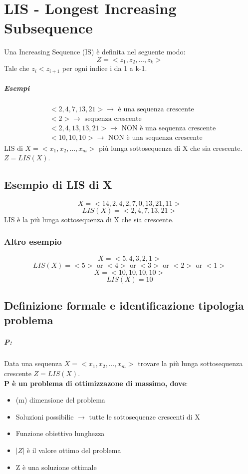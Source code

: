 \chapter{LIS - Longest Increasing Subsequence}
Una Increasing Sequence (IS) è definita nel seguente modo:
\[ Z = <z_1, z_2, \dots, z_k> \]
Tale che $z_i < z_{i+1}$ per ogni indice i da 1 a k-1.
\paragraph*{Esempi}
\begin{align*}
    &<2,4,7,13,21> \rightarrow \text{ è una sequenza crescente}\\
    &<2> \rightarrow \text{ sequenza crescente}\\
    &<2,4,13,13,21> \rightarrow \text{ NON è una sequenza crescente}\\
    &<10,10,10> \rightarrow \text{ NON è una sequenza crescente}
\end{align*}
LIS di $X = <x_1, x_2, \dots, x_m>$ più lunga sottosequenza di X che sia
crescente. $Z = LIS(X)$.
\section{Esempio di LIS di X}  
    \[X= <14, 2, 4, 2, 7, 0, 13, 21, 11>\]
    \[LIS(X) = <2,4,7,13,21>\]
LIS è la più  lunga sottosequenza di X che sia crescente.
\subsection{Altro esempio}
\[X = <5, 4, 3, 2, 1>\]
\[LIS(X)=<5> \text{ or } <4> \text{ or } <3> \text{ or } <2> \text{ or } <1>\] 
\[X=<10, 10, 10, 10>\]
\[LIS(X) = 10 \]
\section{Definizione formale e identificazione tipologia problema}
\paragraph*{P:} Data una sequenza $X = <x_1, x_2, \dots, x_m>$ trovare la più lunga
sottosequenza crescente $Z=LIS(X)$.\\
\textbf{P è un problema di ottimizzazone di massimo, dove}:
\begin{itemize}
    \item (m) \ra dimensione del problema
    \item Soluzioni possibilie $\rightarrow$ tutte le sottosequenze crescenti di X
    \item Funzione obiettivo \ra lunghezza
    \item $|Z|$ è il valore ottimo del problema
    \item Z è una soluzione ottimale
\end{itemize}
